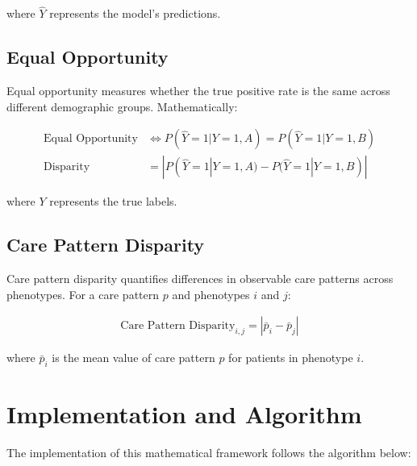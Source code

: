 \documentclass[12pt]{article}
\begin{document}
where $\hat{Y}$ represents the model's predictions.

\subsection{Equal Opportunity}

Equal opportunity measures whether the true positive rate is the same across different demographic groups. Mathematically:

\begin{align}
\text{Equal Opportunity} &\iff P(\hat{Y}=1|Y=1,A) = P(\hat{Y}=1|Y=1,B)\\
\text{Disparity} &= |P(\hat{Y}=1|Y=1,A) - P(\hat{Y}=1|Y=1,B)|
\end{align}

where $Y$ represents the true labels.

\subsection{Care Pattern Disparity}

Care pattern disparity quantifies differences in observable care patterns across phenotypes. For a care pattern $p$ and phenotypes $i$ and $j$:

\begin{align}
\text{Care Pattern Disparity}_{i,j} = |\bar{p}_i - \bar{p}_j|
\end{align}

where $\bar{p}_i$ is the mean value of care pattern $p$ for patients in phenotype $i$.

\section{Implementation and Algorithm}

The implementation of this mathematical framework follows the algorithm below:
\end{document}
